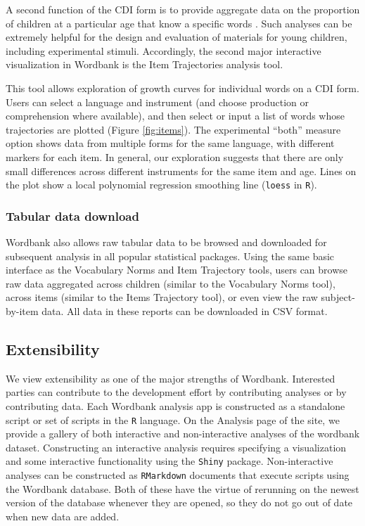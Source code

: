 \documentclass[doc,noapacite]{apa2}
\begin{document}
A second function of the CDI form is to provide aggregate data on the proportion of children at a particular age that know a specific words \cite{fenson2007,jorgensen2010}. Such analyses can be extremely helpful for the design and evaluation of materials for young children, including experimental stimuli. Accordingly, the second major interactive visualization in Wordbank is the Item Trajectories analysis tool. 

This tool allows exploration of growth curves for individual words on a CDI form. Users can select a language and instrument (and choose production or comprehension where available), and then select or input a list of words whose trajectories are plotted (Figure \ref{fig:items}). The experimental ``both'' measure option shows data from multiple forms for the same language, with different markers for each item. In general, our exploration suggests that there are only small differences across different instruments for the same item and age. Lines on the plot show a local polynomial regression smoothing line (\texttt{loess} in \texttt{R}). 

\subsubsection{Tabular data download}

Wordbank also allows raw tabular data to be browsed and downloaded for subsequent analysis in all popular statistical packages. Using the same basic interface as the Vocabulary Norms and Item Trajectory tools, users can browse raw data aggregated across children (similar to the Vocabulary Norms tool), across items (similar to the Items Trajectory tool), or even view the raw subject-by-item data. All data in these reports can be downloaded in CSV format. 

\subsection{Extensibility}

We view extensibility as one of the major strengths of Wordbank. Interested parties can contribute to the development effort by contributing analyses or by contributing data. Each Wordbank analysis app is constructed as a standalone script or set of scripts in the \texttt{R} language. On the Analysis page of the site, we provide a gallery of both interactive and non-interactive analyses of the wordbank dataset. Constructing an interactive analysis requires specifying a visualization and some interactive functionality using the \texttt{Shiny} package. Non-interactive analyses can be constructed as \texttt{RMarkdown} documents that execute scripts using the Wordbank database. Both of these have the virtue of rerunning on the newest version of the database whenever they are opened, so they do not go out of date when new data are added. 
\end{document}
